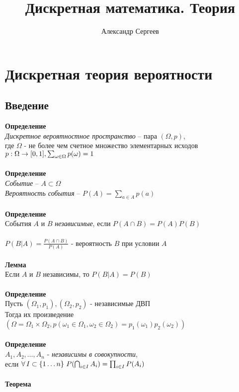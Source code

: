 \documentclass[12pt]{article}
\title{Дискретная математика. Теория}
\author{Александр Сергеев}
\date{}
\begin{document}
\maketitle
\section{Дискретная теория вероятности}
\subsection{Введение}
\textbf{Определение}\\
\textit{Дискретное вероятностное пространство} -- пара $(\Omega, p)$,\\
где $\Omega$ - не более чем счетное множество элементарных исходов\\
$p: \Omega \rightarrow [0, 1], \sum_{\omega \in \Omega} p(\omega) = 1$\\\\
\textbf{Определение}\\
\textit{Событие} -- $A \subset \Omega$\\
\textit{Вероятность события} -- $P(A) = \sum_{a \in A} p(a)$\\\\
\textbf{Определение}\\
События $A$ и $B$ \textit{независимые}, если $P(A \cap B) = P(A)P(B)$\\\\
$P(B|A) = \frac{P(A \cap B)}{P(A)}$ - вероятность $B$ при условии $A$\\\\
\textbf{Лемма}\\
Если $A$ и $B$ независимы, то $P(B|A) = P(B)$\\\\
\textbf{Определение}\\
Пусть $(\Omega_1, p_1), (\Omega_2, p_2)$ - независимые ДВП\\
Тогда их произведение $(\Omega = \Omega_1 \times \Omega_2, p(\omega_1 \in \Omega_1, \omega_2 \in \Omega_2) = p_1(\omega_1)p_2(\omega_2))$\\\\
\textbf{Определение}\\
$A_1, A_2, \ldots, A_n$ - \textit{независимы в совокупности},\\
если $\fall I \subset \{1\ldots n\}\ P(\bigcap_{i\in I} A_i) = \prod_{i\in I}P(A_i)$\\\\
\textbf{Теорема}\\
\end{document}
